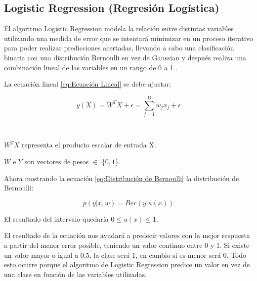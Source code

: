\subsection{Logistic Regression (Regresión Logística)}
\label{sec:LR}
El algoritmo Logistic Regression modela la relación entre distintas variables utilizando una medida de error que se intentará minimizar en un proceso iterativo para poder realizar predicciones acertadas, llevando a cabo una clasificación binaria con una distribución Bernoulli en vez de Gaussian y después realiza una combinación lineal de las variables en un rango de 0 a 1 \cite{ Stoltzfus2011}.\\
\par La ecuación lineal \ref{eq:Ecuación Lineal} se debe ajustar:\\
\begin{Large}
	\begin{equation}
		y(X)=W^{T}X + \epsilon = \sum_{j=1}^{D}w_{j}x_{j} + \epsilon
		\label{eq:Ecuación Lineal}
	\end{equation}
\end{Large}\\ 
\par $W^{T}X$ representa el producto escalar de entrada X.
\par $W$ e $Y$ son vectores de pesos $\in$ $\lbrace 0,1 \rbrace$.\\

\par Ahora mostrando la ecuación \ref{eq:Distribución de Bernoulli} la distribución de Bernoulli:\\
\begin{Large}
	\begin{equation}
		p(y|x,w) = Ber(y|u(x))
		\label{eq:Distribución de Bernoulli}
	\end{equation}
\end{Large}
\begin{center}
	El resultado del intervalo quedaría $0 \leq u(x) \leq 1$.\\
\end{center}
\par El resultado de la ecuación nos ayudará a predecir valores con la mejor respuesta a partir del menor error posible, teniendo un valor continuo entre 0 y 1. Si existe un valor mayor o igual a 0.5, la clase será 1, en cambio si es menor será 0. Todo esto ocurre porque el algoritmo de Logistic Regression predice un valor en vez de una clase en función de las variables utilizadas.\\


